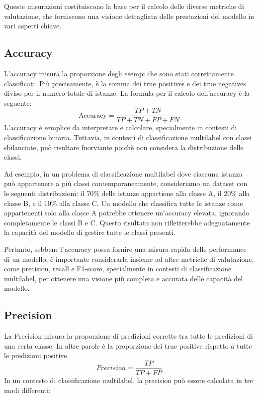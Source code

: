 \documentclass[../../Thesis.tex]{subfiles}
\begin{document}
Queste misurazioni costituiscono la base per il calcolo delle diverse metriche di valutazione, che forniscono una visione dettagliata delle prestazioni del modello in vari aspetti chiave.

\subsection{Accuracy}
L'accuracy misura la proporzione degli esempi che sono stati correttamente classificati. Pi\`u precisamente, \`e la somma dei true positives e dei true negatives diviso per il numero totale di istanze. La formula per il calcolo dell'accuracy \`e la seguente:
$$ \text{Accuracy} = \frac{TP + TN}{TP + TN + FP + FN} $$
L'accuracy \`e semplice da interpretare e calcolare, specialmente in contesti di classificazione binaria. Tuttavia, in contesti di classificazione multilabel con classi sbilanciate, pu\`o risultare fuorviante poich\`e non considera la distribuzione delle classi.

Ad esempio, in un problema di classificazione multilabel dove ciascuna istanza pu\`o appartenere a pi\`u classi contemporaneamente, consideriamo un dataset con le seguenti distribuzioni: il 70\% delle istanze appartiene alla classe A, il 20\% alla classe B, e il 10\% alla classe C. Un modello che classifica tutte le istanze come appartenenti solo alla classe A potrebbe ottenere un'accuracy elevata, ignorando completamente le classi B e C. Questo risultato non rifletterebbe adeguatamente la capacit\`a del modello di gestire tutte le classi presenti. 

Pertanto, sebbene l'accuracy possa fornire una misura rapida delle performance di un modello, \`e importante considerarla insieme ad altre metriche di valutazione, come precision, recall e F1-score, specialmente in contesti di classificazione multilabel, per ottenere una visione pi\`u completa e accurata delle capacit\`a del modello.

\subsection{Precision}
La Precision misura la proporzione di predizioni corrette tra tutte le predizioni di una certa classe. In altre parole \`e la proporzione dei true positive rispetto a tutte le predizioni positive.
$$Precision = \frac{ TP}{ TP + FP} $$
In un contesto di classificazione multilabel, la precision pu\`o essere calcolata in tre modi differenti:
\end{document}
